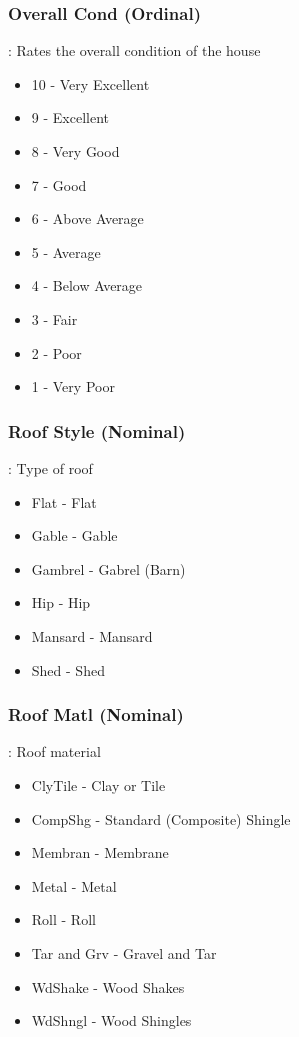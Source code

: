 \documentclass[sigconf]{acmart}
\begin{document}
	\subsubsection{Overall Cond (Ordinal)}: Rates the overall condition of the house
	\begin{itemize}
		\item  10 - Very Excellent
		\item  9 -  Excellent
		\item  8 -  Very Good
		\item  7 -  Good
		\item  6 -  Above Average
		\item  5 -  Average
		\item  4 -  Below Average
		\item  3 -  Fair
		\item  2 -  Poor
		\item  1 -  Very Poor
	\end{itemize}

	\subsubsection{Roof Style (Nominal)}: Type of roof
	\begin{itemize}
		
		\item  Flat - Flat
		\item  Gable - Gable
		\item  Gambrel - Gabrel (Barn)
		\item  Hip - Hip
		\item  Mansard - Mansard
		\item  Shed - Shed
	\end{itemize}

	\subsubsection{Roof Matl (Nominal)}: Roof material
	\begin{itemize}
		\item  ClyTile - Clay or Tile
		\item  CompShg - Standard (Composite) Shingle
		\item  Membran - Membrane
		\item  Metal -   Metal
		\item  Roll - Roll
		\item  Tar and Grv - Gravel and Tar
		\item  WdShake - Wood Shakes
		\item  WdShngl - Wood Shingles
	\end{itemize}
\end{document}
